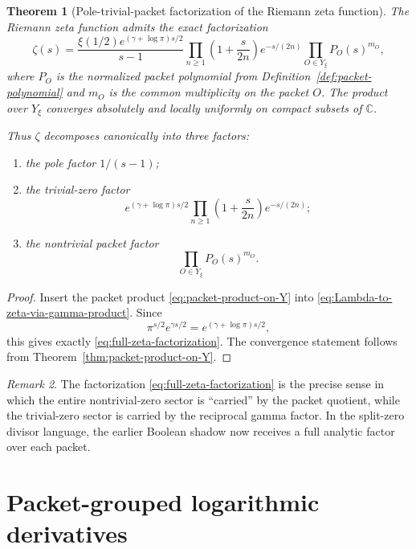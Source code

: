 \documentclass[11pt,a4paper]{article}
\numberwithin{equation}{section}
\newtheorem{theorem}{Theorem}[section]
\theoremstyle{definition}
\theoremstyle{remark}
\newtheorem{remark}[theorem]{Remark}
\newcommand{\CC}{\mathbb C}
\begin{document}
\begin{theorem}[Pole-trivial-packet factorization of the Riemann zeta function]\label{thm:full-zeta-factorization}
The Riemann zeta function admits the exact factorization
\begin{equation}\label{eq:full-zeta-factorization}
\zeta(s)
=
\frac{\xi(1/2)e^{(\gamma+\log\pi)s/2}}{s-1}
\prod_{n\ge 1}\left(1+\frac{s}{2n}\right)e^{-s/(2n)}
\prod_{O\in Y_\xi} P_O(s)^{m_O},
\end{equation}
where $P_O$ is the normalized packet polynomial from Definition~\ref{def:packet-polynomial} and $m_O$ is the common multiplicity on the packet $O$.  The product over $Y_\xi$ converges absolutely and locally uniformly on compact subsets of $\CC$.

Thus $\zeta$ decomposes canonically into three factors:
\begin{enumerate}[label=(\roman*)]
\item the pole factor $1/(s-1)$;
\item the trivial-zero factor
\[
e^{(\gamma+\log\pi)s/2}\prod_{n\ge 1}\left(1+\frac{s}{2n}\right)e^{-s/(2n)};
\]
\item the nontrivial packet factor
\[
\prod_{O\in Y_\xi} P_O(s)^{m_O}.
\]
\end{enumerate}
\end{theorem}

\begin{proof}
Insert the packet product \eqref{eq:packet-product-on-Y} into \eqref{eq:Lambda-to-zeta-via-gamma-product}.  Since
\[
\pi^{s/2}e^{\gamma s/2}=e^{(\gamma+\log\pi)s/2},
\]
this gives exactly \eqref{eq:full-zeta-factorization}.  The convergence statement follows from Theorem~\ref{thm:packet-product-on-Y}.
\end{proof}

\begin{remark}
The factorization \eqref{eq:full-zeta-factorization} is the precise sense in which the entire nontrivial-zero sector is ``carried'' by the packet quotient, while the trivial-zero sector is carried by the reciprocal gamma factor.  In the split-zero divisor language, the earlier Boolean shadow now receives a full analytic factor over each packet.
\end{remark}

\section{Packet-grouped logarithmic derivatives}
\end{document}
